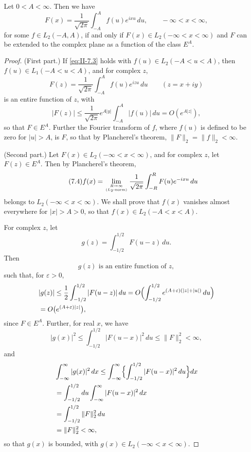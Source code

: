\begin{theorem}\label{thm:II-10}
Let $0<A<\infty$. Then we have
\begin{equation}\tag{7.3}\label{eq:II-7.3}
F(x)=\frac{1}{\sqrt{2\pi}}\int_{-A}^{A}f(u)e^{ixu}\,du,\qquad-\infty<x<\infty,
\end{equation}
for some $f\in L_{2}(-A,A)$, if and only if $F(x)\in L_{2}(-\infty<x<\infty)$ and $F$ can be extended to the complex plane as a function of the class $E^{A}$.
\end{theorem}
\begin{proof}
(First part.) If \eqref{eq:II-7.3} holds with $f(u)\in L_{2}(-A<u<A)$, then $f(u)\in L_{1}(-A<u<A)$, and for complex $z$,
\[
F(z)=\frac{1}{\sqrt{2\pi}}\int_{-A}^{A}f(u)e^{izu}\,du\qquad(z=x+iy)
\]
is an entire function of $z$, with
\[
|F(z)|\le\frac{1}{\sqrt{2\pi}}e^{A|y|}\int_{-A}^{A}|f(u)|\,du=O(e^{A|z|}),
\]
so that $F\in E^{A}$. Further the Fourier transform of $f$, where $f(u)$ is defined to be zero for $|u|>A$, is $F$, so that by Plancherel's theorem, $\|F\|_{2}=\|f\|_{2}<\infty$.

(Second part.) Let $F(x)\in L_{2}(-\infty<x<\infty)$, and for complex $z$, let $F(z)\in E^{A}$. Then by Plancherel's theorem,
\begin{equation}\tag{7.4}\label{eq:II-7.4}
f(x)=\lim_{R\to\infty\atop(L_{2}\text{-norm})}\frac{1}{\sqrt{2\pi}}\int_{-R}^{R}F(u)e^{-ixu}\,du
\end{equation}
belongs to $L_{2}(-\infty<x<\infty)$. We shall prove that $f(x)$ vanishes almost everywhere for $|x|>A>0$, so that $f(x)\in L_{2}(-A<x<A)$.

For complex $z$, let
\begin{equation}\tag{7.5}\label{eq:II-7.5}
g(z)=\int_{-1/2}^{1/2}F(u-z)\,du.
\end{equation}
Then
\begin{equation}\tag{7.6}\label{eq:II-7.6}
g(z)\text{ is an entire function of }z,
\end{equation}
such that, for $\varepsilon>0$,
\[
\begin{aligned}
&|g(z)| \le \frac{1}{2}  \int_{-1/2}^{1/2}|F(u-z)|\,du = O  \Bigl(\int_{-1/2}^{1/2}e^{(A+\varepsilon)(|z|+|u|)}\,du\Bigr)\\
&= O  \bigl(e^{(A+\varepsilon)|z|}\bigr),
\end{aligned}
\]
since $F\in E^{A}$. Further, for real $x$, we have
\begin{equation}\tag{7.7}\label{eq:II-7.7}
|g(x)|^{2}\le\int_{-1/2}^{1/2}|F(u-x)|^{2}\,du\le \|F\|_{2}^{2}<\infty,
\end{equation}
and
\[
\begin{aligned}
& \int_{-\infty}^{\infty}|g(x)|^{2}\,dx \le \int_{-\infty}^{\infty}  \Bigl\{  \int_{-1/2}^{1/2}|F(u-x)|^{2}\,du\Bigr\}dx\\
&= \int_{-1/2}^{1/2}du  \int_{-\infty}^{\infty}|F(u-x)|^{2}\,dx\\
&= \int_{-1/2}^{1/2}\|F\|_{2}^{2}\,du\\
&= \|F\|_{2}^{2}<\infty,
\end{aligned}
\]
so that $g(x)$ is bounded, with $g(x)\in L_{2}(-\infty<x<\infty)$.


\end{proof}
